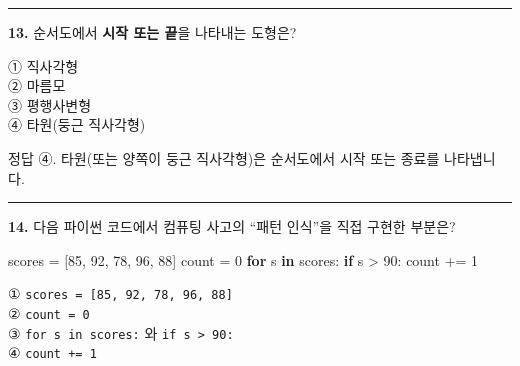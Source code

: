 \documentclass[
  korean,
  11pt,
  a4paper,
  DIV=11,
  numbers=noendperiod]{scrreprt}
\newenvironment{Shaded}{\begin{snugshade}}{\end{snugshade}}
\newcommand{\ControlFlowTok}[1]{\textcolor[rgb]{0.00,0.23,0.31}{\textbf{#1}}}
\newcommand{\DecValTok}[1]{\textcolor[rgb]{0.68,0.00,0.00}{#1}}
\newcommand{\KeywordTok}[1]{\textcolor[rgb]{0.00,0.23,0.31}{\textbf{#1}}}
\newcommand{\NormalTok}[1]{\textcolor[rgb]{0.00,0.23,0.31}{#1}}
\newcommand{\OperatorTok}[1]{\textcolor[rgb]{0.37,0.37,0.37}{#1}}
\begin{document}
\begin{center}\rule{0.5\linewidth}{0.5pt}\end{center}

\textbf{13.} 순서도에서 \textbf{시작 또는 끝}을 나타내는 도형은?

① 직사각형\\
② 마름모\\
③ 평행사변형\\
④ 타원(둥근 직사각형)

\begin{tcolorbox}[enhanced jigsaw, arc=.35mm, bottomrule=.15mm, bottomtitle=1mm, breakable, colback=white, colbacktitle=quarto-callout-note-color!10!white, colframe=quarto-callout-note-color-frame, coltitle=black, left=2mm, leftrule=.75mm, opacityback=0, opacitybacktitle=0.6, rightrule=.15mm, title=\textcolor{quarto-callout-note-color}{\faInfo}\hspace{0.5em}{노트}, titlerule=0mm, toprule=.15mm, toptitle=1mm]

정답 ④. 타원(또는 양쪽이 둥근 직사각형)은 순서도에서 시작 또는 종료를
나타냅니다.

\end{tcolorbox}

\begin{center}\rule{0.5\linewidth}{0.5pt}\end{center}

\textbf{14.} 다음 파이썬 코드에서 컴퓨팅 사고의 ``패턴 인식''을 직접
구현한 부분은?

\begin{Shaded}
\begin{Highlighting}[]
\NormalTok{scores }\OperatorTok{=}\NormalTok{ [}\DecValTok{85}\NormalTok{, }\DecValTok{92}\NormalTok{, }\DecValTok{78}\NormalTok{, }\DecValTok{96}\NormalTok{, }\DecValTok{88}\NormalTok{]}
\NormalTok{count }\OperatorTok{=} \DecValTok{0}
\ControlFlowTok{for}\NormalTok{ s }\KeywordTok{in}\NormalTok{ scores:}
    \ControlFlowTok{if}\NormalTok{ s }\OperatorTok{\textgreater{}} \DecValTok{90}\NormalTok{:}
\NormalTok{        count }\OperatorTok{+=} \DecValTok{1}
\end{Highlighting}
\end{Shaded}

① \texttt{scores\ =\ {[}85,\ 92,\ 78,\ 96,\ 88{]}}\\
② \texttt{count\ =\ 0}\\
③ \texttt{for\ s\ in\ scores:} 와 \texttt{if\ s\ \textgreater{}\ 90:}\\
④ \texttt{count\ +=\ 1}
\end{document}
